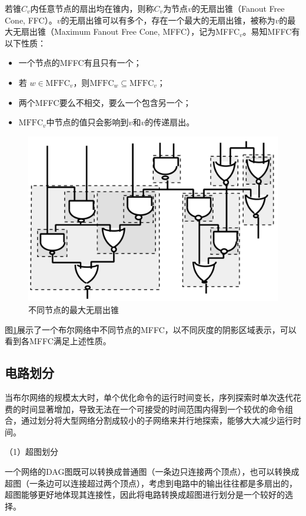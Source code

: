 若锥$C_v$内任意节点的扇出均在锥内，则称$C_v$为节点$v$的无扇出锥（Fanout Free Cone, FFC）。$v$的无扇出锥可以有多个，存在一个最大的无扇出锥，被称为$v$的最大无扇出锥（Maximum Fanout Free Cone, MFFC），记为MFFC$_v$。易知MFFC有以下性质\cite{LS:exact_rewriting,FPGA:Jason_Cong_1993,FPGA:Jason_Cong_patition}：
\begin{itemize}
    \item 一个节点的MFFC有且只有一个；
    \item 若 $w \in \text{MFFC}_v$，则$\text{MFFC}_w \subseteq \text{MFFC}_v$；
    \item 两个MFFC要么不相交，要么一个包含另一个；
    \item $\text{MFFC}_v$中节点的值只会影响到$v$和$v$的传递扇出。
\end{itemize}
\begin{figure}[!htbp]
    \centering
    \includegraphics[width=0.6\linewidth]{./figs/LS-MFFC.png}
    \caption{不同节点的最大无扇出锥}
    \label{LS:MFFC}
\end{figure}
图\ref{LS:MFFC}展示了一个布尔网络中不同节点的MFFC，以不同灰度的阴影区域表示，可以看到各MFFC满足上述性质。


\subsection{电路划分}

当布尔网络的规模太大时，单个优化命令的运行时间变长，序列探索时单次迭代花费的时间显著增加，导致无法在一个可接受的时间范围内得到一个较优的命令组合，通过划分将大型网络分割成较小的子网络来并行地探索，能够大大减少运行时间。

（1）超图划分

一个网络的DAG图既可以转换成普通图（一条边只连接两个顶点），也可以转换成超图（一条边可以连接超过两个顶点），考虑到电路中的输出往往都是多扇出的，超图能够更好地体现其连接性，因此将电路转换成超图进行划分是一个较好的选择\cite{LS:LSOracle}。

